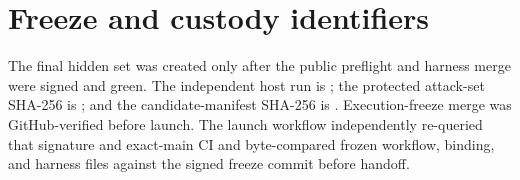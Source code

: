 \section{Freeze and custody identifiers}
The final hidden set was created only after the public preflight and harness merge were signed and green. The independent host run is ; the protected attack-set SHA-256 is
; and the candidate-manifest SHA-256 is
. Execution-freeze merge  was GitHub-verified before launch. The launch workflow independently re-queried that signature and exact-main CI and byte-compared frozen workflow, binding, and harness files against the signed freeze commit before handoff.

